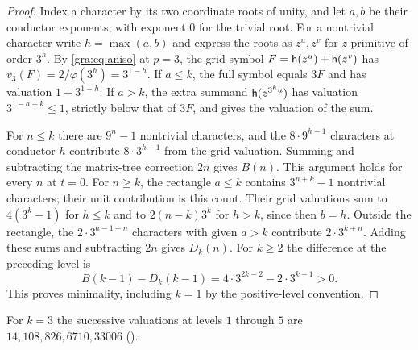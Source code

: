 \begin{proof}
Index a character by its two coordinate roots of unity, and let $a,b$ be
their conductor exponents, with exponent $0$ for the trivial root. For a
nontrivial character write $h=\max(a,b)$ and express the roots as
$z^u,z^v$ for $z$ primitive of order $3^h$. By \cref{gra:eq:aniso} at
$p=3$, the grid symbol $F=\mathsf{h}(z^u)+\mathsf{h}(z^v)$ has
$v_3(F)=2/\varphi(3^h)=3^{1-h}$. If $a\le k$, the full symbol equals $3F$
and has valuation $1+3^{1-h}$. If $a>k$, the extra summand
$\mathsf{h}(z^{3^ku})$ has valuation $3^{1-a+k}\le1$, strictly below that of
$3F$, and gives the valuation of the sum.

For $n\le k$ there are $9^n-1$ nontrivial characters, and the
$8\cdot9^{h-1}$ characters at conductor $h$ contribute $8\cdot3^{h-1}$
from the grid valuation. Summing and subtracting the matrix-tree
correction $2n$ gives $B(n)$. This argument holds for every $n$ at $t=0$.
For $n\ge k$, the rectangle $a\le k$ contains $3^{n+k}-1$ nontrivial
characters; their unit contribution is this count. Their grid valuations
sum to $4(3^k-1)$ for $h\le k$ and to $2(n-k)3^k$ for $h>k$, since then
$b=h$. Outside the rectangle, the $2\cdot3^{a-1+n}$ characters with given
$a>k$ contribute $2\cdot3^{k+n}$. Adding these sums and subtracting $2n$
gives $D_k(n)$. For $k\ge2$ the difference at the preceding level is
\[
 B(k-1)-D_k(k-1)=4\cdot3^{2k-2}-2\cdot3^{k-1}>0 .
\]
This proves minimality, including $k=1$ by the positive-level convention.
\end{proof}

For $k=3$ the successive valuations at levels $1$ through $5$ are
$14,108,826,6710,33006$
().


